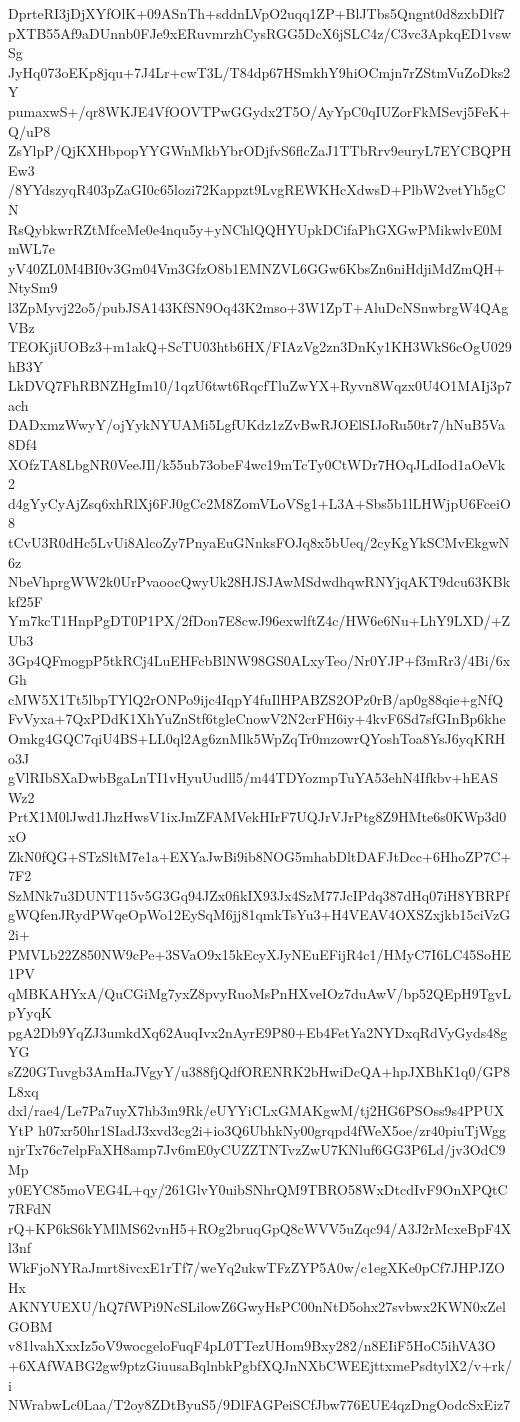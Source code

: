 DprteRI3jDjXYfOlK+09ASnTh+sddnLVpO2uqq1ZP+BlJTbs5Qngnt0d8zxbDlf7
pXTB55Af9aDUnnb0FJe9xERuvmrzhCysRGG5DcX6jSLC4z/C3vc3ApkqED1vswSg
JyHq073oEKp8jqu+7J4Lr+cwT3L/T84dp67HSmkhY9hiOCmjn7rZStmVuZoDks2Y
pumaxwS+/qr8WKJE4VfOOVTPwGGydx2T5O/AyYpC0qIUZorFkMSevj5FeK+Q/uP8
ZsYlpP/QjKXHbpopYYGWnMkbYbrODjfvS6flcZaJ1TTbRrv9euryL7EYCBQPHEw3
/8YYdszyqR403pZaGI0c65lozi72Kappzt9LvgREWKHcXdwsD+PlbW2vetYh5gCN
RsQybkwrRZtMfceMe0e4nqu5y+yNChlQQHYUpkDCifaPhGXGwPMikwlvE0MmWL7e
yV40ZL0M4BI0v3Gm04Vm3GfzO8b1EMNZVL6GGw6KbsZn6niHdjiMdZmQH+NtySm9
l3ZpMyvj22o5/pubJSA143KfSN9Oq43K2mso+3W1ZpT+AluDcNSnwbrgW4QAgVBz
TEOKjiUOBz3+m1akQ+ScTU03htb6HX/FIAzVg2zn3DnKy1KH3WkS6cOgU029hB3Y
LkDVQ7FhRBNZHgIm10/1qzU6twt6RqcfTluZwYX+Ryvn8Wqzx0U4O1MAIj3p7ach
DADxmzWwyY/ojYykNYUAMi5LgfUKdz1zZvBwRJOElSIJoRu50tr7/hNuB5Va8Df4
XOfzTA8LbgNR0VeeJIl/k55ub73obeF4wc19mTcTy0CtWDr7HOqJLdIod1aOeVk2
d4gYyCyAjZsq6xhRlXj6FJ0gCc2M8ZomVLoVSg1+L3A+Sbs5b1lLHWjpU6FceiO8
tCvU3R0dHc5LvUi8AlcoZy7PnyaEuGNnksFOJq8x5bUeq/2cyKgYkSCMvEkgwN6z
NbeVhprgWW2k0UrPvaoocQwyUk28HJSJAwMSdwdhqwRNYjqAKT9dcu63KBkkf25F
Ym7kcT1HnpPgDT0P1PX/2fDon7E8cwJ96exwlftZ4c/HW6e6Nu+LhY9LXD/+ZUb3
3Gp4QFmogpP5tkRCj4LuEHFcbBlNW98GS0ALxyTeo/Nr0YJP+f3mRr3/4Bi/6xGh
cMW5X1Tt5lbpTYlQ2rONPo9ijc4IqpY4fuIlHPABZS2OPz0rB/ap0g88qie+gNfQ
FvVyxa+7QxPDdK1XhYuZnStf6tgleCnowV2N2crFH6iy+4kvF6Sd7sfGInBp6khe
Omkg4GQC7qiU4BS+LL0ql2Ag6znMlk5WpZqTr0mzowrQYoshToa8YsJ6yqKRHo3J
gVlRIbSXaDwbBgaLnTI1vHyuUudll5/m44TDYozmpTuYA53ehN4Ifkbv+hEASWz2
PrtX1M0lJwd1JhzHwsV1ixJmZFAMVekHIrF7UQJrVJrPtg8Z9HMte6s0KWp3d0xO
ZkN0fQG+STzSltM7e1a+EXYaJwBi9ib8NOG5mhabDltDAFJtDcc+6HhoZP7C+7F2
SzMNk7u3DUNT115v5G3Gq94JZx0fikIX93Jx4SzM77JcIPdq387dHq07iH8YBRPf
gWQfenJRydPWqeOpWo12EySqM6jj81qmkTsYu3+H4VEAV4OXSZxjkb15ciVzG2i+
PMVLb22Z850NW9cPe+3SVaO9x15kEcyXJyNEuEFijR4c1/HMyC7I6LC45SoHE1PV
qMBKAHYxA/QuCGiMg7yxZ8pvyRuoMsPnHXveIOz7duAwV/bp52QEpH9TgvLpYyqK
pgA2Db9YqZJ3umkdXq62AuqIvx2nAyrE9P80+Eb4FetYa2NYDxqRdVyGyds48gYG
sZ20GTuvgb3AmHaJVgyY/u388fjQdfORENRK2bHwiDcQA+hpJXBhK1q0/GP8L8xq
dxl/rae4/Le7Pa7uyX7hb3m9Rk/eUYYiCLxGMAKgwM/tj2HG6PSOss9s4PPUXYtP
h07xr50hr1SIadJ3xvd3cg2i+io3Q6UbhkNy00grqpd4fWeX5oe/zr40piuTjWgg
njrTx76c7elpFaXH8amp7Jv6mE0yCUZZTNTvzZwU7KNluf6GG3P6Ld/jv3OdC9Mp
y0EYC85moVEG4L+qy/261GlvY0uibSNhrQM9TBRO58WxDtcdIvF9OnXPQtC7RFdN
rQ+KP6kS6kYMlMS62vnH5+ROg2bruqGpQ8cWVV5uZqc94/A3J2rMcxeBpF4Xl3nf
WkFjoNYRaJmrt8ivcxE1rTf7/weYq2ukwTFzZYP5A0w/c1egXKe0pCf7JHPJZOHx
AKNYUEXU/hQ7fWPi9NcSLilowZ6GwyHsPC00nNtD5ohx27svbwx2KWN0xZelGOBM
v81lvahXxxIz5oV9wocgeloFuqF4pL0TTezUHom9Bxy282/n8EIiF5HoC5ihVA3O
+6XAfWABG2gw9ptzGiuusaBqlnbkPgbfXQJnNXbCWEEjttxmePsdtylX2/v+rk/i
NWrabwLc0Laa/T2oy8ZDtByuS5/9DlFAGPeiSCfJbw776EUE4qzDngOodcSxEiz7
